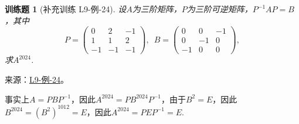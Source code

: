\documentclass[12pt,fontset=fandol]{ctexart}
\newtheorem{exercise}{训练题}[section]
\begin{document}
\begin{exercise}[补充训练 L9-例-24]\label{prob:L9-例-24}
设$A$为三阶矩阵，$P$为三阶可逆矩阵，$P^{-1}AP=B$，其中
              \[P=\begin{pmatrix}
                      0 & 2 & -1 \\ 1 & 1 & 2 \\ -1 & -1 & -1
                  \end{pmatrix},\enspace B=\begin{pmatrix}
                      0 & 0 & -1 \\ 0 & -1 & 0 \\ -1 & 0 & 0
                  \end{pmatrix},\]
              求$A^{2024}$.
\end{exercise}
\noindent 来源：\href{https://github.com/yhwu-is/Linear-Algebra-Left-Undone/blob/new/%E8%AE%B2%E4%B9%89/%E4%B8%93%E9%A2%98/9%20%E7%9F%A9%E9%98%B5%E8%BF%90%E7%AE%97%E8%BF%9B%E9%98%B6.tex}{L9-例-24}。
\begin{solve}
事实上$A=PBP^{-1}$，因此$A^{2024}=PB^{2024}P^{-1}$，由于$B^2=E$，因此$B^{2024}=(B^2)^{1012}=E$，因此$A^{2024}=PEP^{-1}=E$.
\end{solve}
\end{document}
